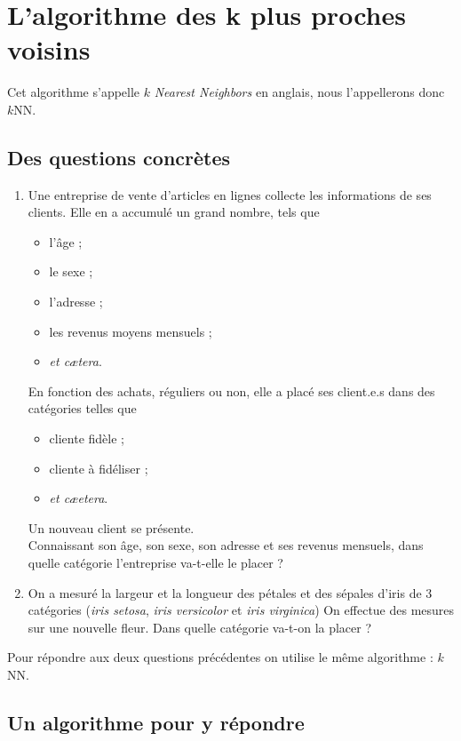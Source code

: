 \chapter{L'algorithme des k plus proches voisins}
Cet algorithme s'appelle $k$ \textit{Nearest Neighbors} en anglais, nous l'appellerons donc $k$NN.

\section{Des questions concrètes}

\begin{enumerate}
	\item Une entreprise de vente d'articles en lignes collecte les informations de ses clients. Elle en a accumulé un grand nombre, tels que 
	\begin{itemize}
		\item l'âge ;
		\item le sexe ;
    	\item l'adresse ;
    	\item les revenus moyens mensuels ;
    	\item \textit{et cætera}.
	\end{itemize}
    En fonction des achats, réguliers ou non, elle a placé ses client.e.s dans des catégories telles que
    \begin{itemize}
    	\item client\cdot e fidèle ;
    	\item client\cdot e à fidéliser ;
    	\item \textit{et cæetera}.
    \end{itemize}
    Un nouveau client se présente.\\
    Connaissant son âge, son sexe, son adresse et ses revenus mensuels, dans quelle catégorie l'entreprise va-t-elle le placer ?

	\item On a mesuré la largeur et la longueur des pétales et des  sépales d'iris de 3 catégories (\textit{iris setosa}, \textit{iris versicolor} et \textit{iris virginica}) 
    On effectue des mesures sur une nouvelle fleur. Dans quelle catégorie va-t-on la placer ? 

\end{enumerate}

Pour répondre aux deux questions précédentes on utilise le même algorithme : $k$NN.


\section{Un algorithme pour y répondre}

